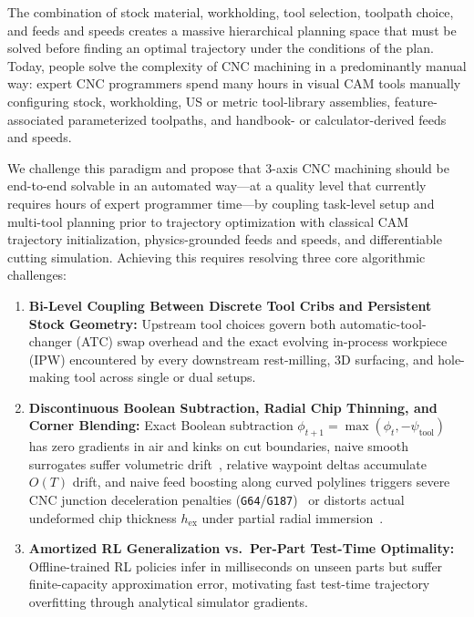 \documentclass[conference]{IEEEtran}
\begin{document}
The combination of stock material, workholding, tool selection, toolpath choice, and feeds and speeds creates a massive hierarchical planning space that must be solved before finding an optimal trajectory under the conditions of the plan. Today, people solve the complexity of CNC machining in a predominantly manual way: expert CNC programmers spend many hours in visual CAM tools manually configuring stock, workholding, US or metric tool-library assemblies, feature-associated parameterized toolpaths, and handbook- or calculator-derived feeds and speeds.

We challenge this paradigm and propose that 3-axis CNC machining should be end-to-end solvable in an automated way—at a quality level that currently requires hours of expert programmer time—by coupling task-level setup and multi-tool planning prior to trajectory optimization with classical CAM trajectory initialization, physics-grounded feeds and speeds, and differentiable cutting simulation. Achieving this requires resolving three core algorithmic challenges:
\begin{enumerate}
  \item \textbf{Bi-Level Coupling Between Discrete Tool Cribs and Persistent Stock Geometry:} Upstream tool choices govern both automatic-tool-changer (ATC) swap overhead and the exact evolving in-process workpiece (IPW) encountered by every downstream rest-milling, 3D surfacing, and hole-making tool across single or dual setups.
  \item \textbf{Discontinuous Boolean Subtraction, Radial Chip Thinning, and Corner Blending:} Exact Boolean subtraction $\phi_{t+1} = \max(\phi_t, -\psi_{\text{tool}})$~\cite{vanhook1986dexel,shapiro2007rfunctions} has zero gradients in air and kinks on cut boundaries, naive smooth surrogates suffer volumetric drift~\cite{suh2022differentiable,metz2021gradients}, relative waypoint deltas accumulate $O(T)$ drift, and naive feed boosting along curved polylines triggers severe CNC junction deceleration penalties (\texttt{G64}/\texttt{G187})~\cite{erkorkmaz2001highspeed,kramer2000rs274ngc} or distorts actual undeformed chip thickness $h_{\text{ex}}$ under partial radial immersion~\cite{martellotti1941milling}.
  \item \textbf{Amortized RL Generalization vs.\ Per-Part Test-Time Optimality:} Offline-trained RL policies infer in milliseconds on unseen parts but suffer finite-capacity approximation error, motivating fast test-time trajectory overfitting through analytical simulator gradients.
\end{enumerate}
\end{document}
